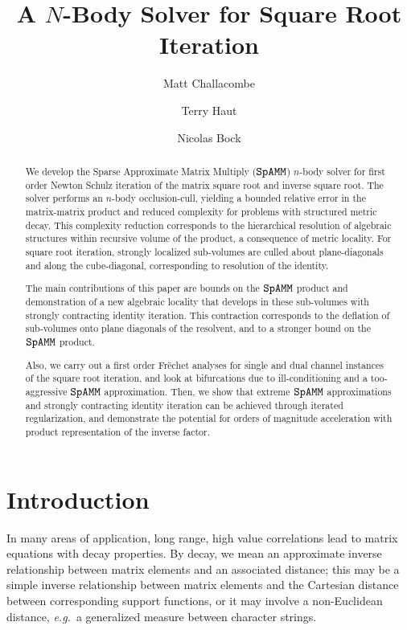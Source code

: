 \documentclass[letterpaper,twocolumn,amsmath,amsfont,amssymb,english,aps,jcp,preprintnumbers,groupaddress,nofootinbib,tightenlines,floatfix]{revtex4}
\theoremstyle{plain}
\theoremstyle{remark}
\theoremstyle{plain}
\begin{document}
\title{A $N$-Body Solver for Square Root Iteration}

\author{Matt Challacombe}

\author{Terry Haut}

\author{Nicolas Bock}



\begin{abstract}
We develop the Sparse Approximate Matrix Multiply ($\tt SpAMM$) $n$-body solver for first order Newton Schulz iteration of the 
matrix square root and inverse square root.
The solver performs an $n$-body occlusion-cull, yielding a bounded relative error in the matrix-matrix product
and reduced complexity for problems with structured metric decay.  This complexity reduction corresponds to 
the hierarchical resolution of algebraic structures within recursive volume of the product, a consequence of 
metric locality.  For square root iteration, strongly localized sub-volumes are  culled about 
plane-diagonals and along the cube-diagonal,  corresponding to resolution of the identity.  

The main contributions of this paper are bounds on the $\tt SpAMM$ product and 
demonstration of a new algebraic locality that develops in these sub-volumes with strongly 
contracting identity iteration. This contraction corresponds to the deflation of sub-volumes 
onto plane diagonals of the resolvent, and to a stronger bound on the $\tt SpAMM$ product.  

Also, we carry out a first order Fr\"{e}chet analyses for single and 
dual channel instances of the square root iteration, and look at bifurcations due to ill-conditioning and a 
too-aggressive $\tt SpAMM$ approximation.  Then, we show that extreme $\tt SpAMM$ approximations and strongly contracting 
identity iteration can be achieved through iterated regularization, and demonstrate the potential for orders of magnitude 
acceleration with product representation of the inverse factor.   
\end{abstract}

\maketitle
\section{Introduction}
In many areas of application, long range, high value correlations lead to matrix equations with decay properties.
By decay, we mean an approximate inverse relationship between matrix elements and an associated distance; 
this may be a simple inverse relationship between matrix elements and the Cartesian distance between
corresponding support functions, or it may involve a non-Euclidean distance, 
{\em  e.g.}~a generalized measure between character strings. 
\end{document}
